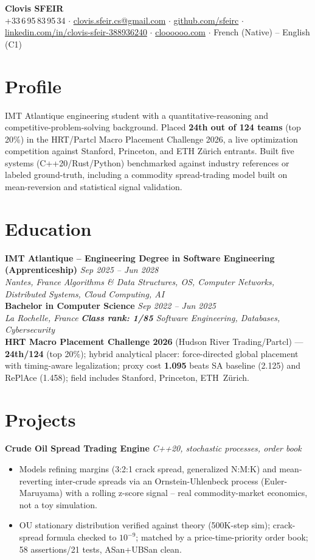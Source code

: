 \documentclass[10pt]{article}
\newcommand{\entry}[4]{%
  \noindent\textbf{#1} \hfill \textit{#2} \\
  \textit{#3} \hfill \textit{#4}\\[-0.3em]
}
\newcommand{\projectentry}[2]{%
  \noindent\textbf{#1} \hfill \textit{#2}\\[-0.3em]
}
\begin{document}
\fontsize{9.3pt}{11pt}\selectfont
\begin{center}
  {\LARGE \textbf{Clovis SFEIR}}\\[0.3em]
  +33\,6\,95\,83\,95\,34 \;$\cdot$\; \href{mailto:clovis.sfeir.cs@gmail.com}{clovis.sfeir.cs@gmail.com} \;$\cdot$\;
  \href{https://github.com/sfeirc}{github.com/sfeirc} \;$\cdot$\;
  \href{https://linkedin.com/in/clovis-sfeir-388936240}{linkedin.com/in/clovis-sfeir-388936240} \;$\cdot$\;
  \href{https://cloooooo.com}{cloooooo.com} \;$\cdot$\; French (Native) -- English (C1)
\end{center}

\section*{Profile}
IMT Atlantique engineering student with a quantitative-reasoning and competitive-problem-solving background. Placed \textbf{24th out of 124 teams} (top 20\%) in the HRT/Partcl Macro Placement Challenge 2026, a live optimization competition against Stanford, Princeton, and ETH Z\"urich entrants. Built five systems (C++20/Rust/Python) benchmarked against industry references or labeled ground-truth, including a commodity spread-trading model built on mean-reversion and statistical signal validation.

\section*{Education}
\entry{IMT Atlantique -- Engineering Degree in Software Engineering (Apprenticeship)}{Sep 2025 -- Jun 2028}{Nantes, France}{Algorithms \& Data Structures, OS, Computer Networks, Distributed Systems, Cloud Computing, AI}
\entry{Bachelor in Computer Science}{Sep 2022 -- Jun 2025}{La Rochelle, France}{\textbf{Class rank: 1/85} \textbar{} Software Engineering, Databases, Cybersecurity}
\noindent\textbf{HRT Macro Placement Challenge 2026} (Hudson River Trading/Partcl) --- \textbf{24th/124} (top 20\%); hybrid analytical placer: force-directed global placement with timing-aware legalization; proxy cost \textbf{1.095} beats SA baseline (2.125) and RePlAce (1.458); field includes Stanford, Princeton, ETH~Z\"urich.

\section*{Projects}

\projectentry{Crude Oil Spread Trading Engine}{C++20, stochastic processes, order book}
\begin{itemize}
  \item Models refining margins (3:2:1 crack spread, generalized N:M:K) and mean-reverting inter-crude spreads via an Ornstein-Uhlenbeck process (Euler-Maruyama) with a rolling z-score signal -- real commodity-market economics, not a toy simulation.
  \item OU stationary distribution verified against theory (500K-step sim); crack-spread formula checked to $10^{-9}$; matched by a price-time-priority order book; 58 assertions/21 tests, ASan+UBSan clean.
\end{itemize}
\end{document}
